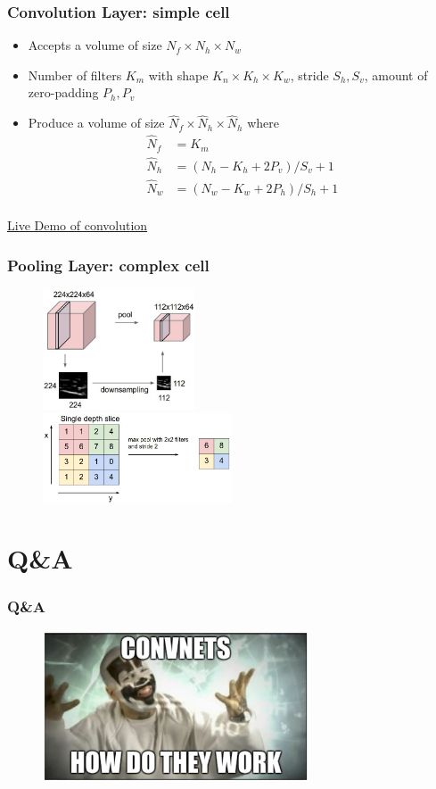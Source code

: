 \documentclass{beamer}
\begin{document}
\begin{frame}
  \frametitle{Convolution Layer: simple cell}

  \begin{itemize}
      \item Accepts a volume of size $N_{f}\times N_{h}\times N_{w}$
      \item Number of filters $K_{m}$ with shape $K_{n}\times K_{h}\times K_{w}$, stride $S_{h}, S_{v}$, amount of zero-padding $P_{h}, P_{v}$
      \item Produce a volume of size $\hat{N}_{f}\times \hat{N}_{h}\times \hat{N}_{h}$ where
      \begin{align*}
          \hat{N}_{f}&=K_{m} \\
        \hat{N}_{h}&=(N_{h}-K_{h}+2P_{v})/S_{v}+1 \\
        \hat{N}_{w}&=(N_{w}-K_{w}+2P_{h})/S_{h}+1 \\
      \end{align*}
  \end{itemize}

  \href{http://rt.dgyblog.com/res/dlworkshop/conv_demo.html}{Live Demo of convolution}
\end{frame}

\begin{frame}
  \frametitle{Pooling Layer: complex cell}

  \begin{figure}
    \centering
    \includegraphics[width=0.4\textwidth]{pool.jpeg}\\
    \includegraphics[width=0.5\textwidth]{maxpool.jpeg}
  \end{figure}
\end{frame}

\section*{Q\&A}

\begin{frame}
  \frametitle{Q\&A}
  \begin{figure}
    \centering
    \includegraphics[width=0.7\textwidth]{convnet_how_to_work.png}
  \end{figure}
\end{frame}
\end{document}
